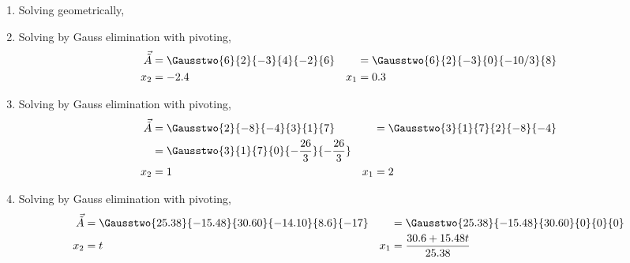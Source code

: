 \begin{enumerate}
    \item Solving geometrically,
          \begin{figure}[H]
              \centering
          \end{figure}

    \item Solving by Gauss elimination with pivoting,
          \begin{align}
              \vec{\tilde{A}}
                  & = \Gausstwo{6}{2}{-3}{4}{-2}{6}    &
                  & = \Gausstwo{6}{2}{-3}{0}{-10/3}{8}   \\
              x_2 & = -2.4                             &
              x_1 & = 0.3
          \end{align}

    \item Solving by Gauss elimination with pivoting,
          \begin{align}
              \vec{\tilde{A}}
                  & = \Gausstwo{2}{-8}{-4}{3}{1}{7}                       &
                  & = \Gausstwo{3}{1}{7}{2}{-8}{-4}                         \\
                  & = \Gausstwo{3}{1}{7}{0}{-\frac{26}{3}}{-\frac{26}{3}}   \\
              x_2 & = 1                                                   &
              x_1 & = 2
          \end{align}

    \item Solving by Gauss elimination with pivoting,
          \begin{align}
              \vec{\tilde{A}}
                  & = \Gausstwo{25.38}{-15.48}{30.60}{-14.10}{8.6}{-17} &
                  & = \Gausstwo{25.38}{-15.48}{30.60}{0}{0}{0}            \\
              x_2 & = t                                                 &
              x_1 & = \frac{30.6 + 15.48 t}{25.38}
          \end{align}


\end{enumerate}
